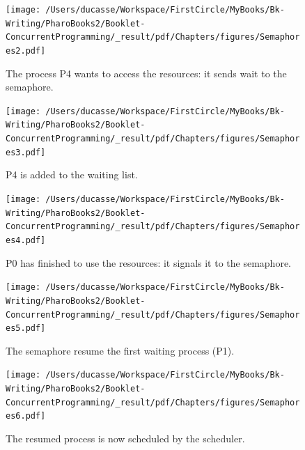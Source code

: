 \documentclass[10pt,twoside,english]{_support/latex/sbabook/sbabook}
\begin{document}
\begin{figure}

\begin{center}
\texttt{[image: /Users/ducasse/Workspace/FirstCircle/MyBooks/Bk-Writing/PharoBooks2/Booklet-ConcurrentProgramming/\_result/pdf/Chapters/figures/Semaphores2.pdf]}\caption{The process P4 wants to access the resources: it sends wait to the semaphore.\label{Sema2}}\end{center}
\end{figure}



\begin{figure}

\begin{center}
\texttt{[image: /Users/ducasse/Workspace/FirstCircle/MyBooks/Bk-Writing/PharoBooks2/Booklet-ConcurrentProgramming/\_result/pdf/Chapters/figures/Semaphores3.pdf]}\caption{P4 is added to the waiting list.\label{Sema3}}\end{center}
\end{figure}



\begin{figure}

\begin{center}
\texttt{[image: /Users/ducasse/Workspace/FirstCircle/MyBooks/Bk-Writing/PharoBooks2/Booklet-ConcurrentProgramming/\_result/pdf/Chapters/figures/Semaphores4.pdf]}\caption{P0 has finished to use the resources: it signals it to the semaphore.\label{Sema4}}\end{center}
\end{figure}



\begin{figure}

\begin{center}
\texttt{[image: /Users/ducasse/Workspace/FirstCircle/MyBooks/Bk-Writing/PharoBooks2/Booklet-ConcurrentProgramming/\_result/pdf/Chapters/figures/Semaphores5.pdf]}\caption{The semaphore resume the first waiting process (P1).\label{Sema5}}\end{center}
\end{figure}



\begin{figure}

\begin{center}
\texttt{[image: /Users/ducasse/Workspace/FirstCircle/MyBooks/Bk-Writing/PharoBooks2/Booklet-ConcurrentProgramming/\_result/pdf/Chapters/figures/Semaphores6.pdf]}\caption{The resumed process is now scheduled by the scheduler.\label{Sema6}}\end{center}
\end{figure}
\end{document}
